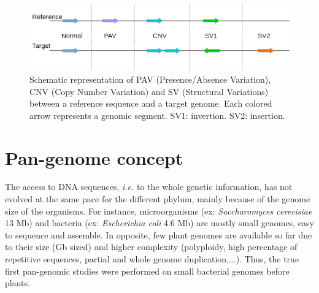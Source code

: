 \documentclass[a4paper,10pt,twoside]{report}
\begin{document}
\begin{figure}[ht]
\centering

 \includegraphics[scale=1]{PAVcnvSV.png}
% 
% 
 \caption{Schematic representation of PAV (Presence/Absence Variation), CNV (Copy Number Variation) and SV (Structural Variations) between a reference sequence and a target genome. Each colored arrow represents a genomic segment. SV1: invertion. SV2: insertion.}
 \label{PAVcaption}
\end{figure}

\section{Pan-genome concept}

The access to DNA sequences, \textit{i.e.} to the whole genetic information, has not evolved at the same pace for the different phylum, mainly because of the genome size of the organisms. For instance, microorganisms (ex: \emph{Saccharomyces cerevisiae} 13 Mb) and bacteria (ex: \emph{Escherichia coli} 4.6 Mb) are mostly small genomes, easy to sequence and assemble. In  opposite, few plant genomes are available so far due to their size (Gb sized) and higher complexity (polyploidy, high percentage of repetitive sequences, partial and whole genome duplication,...). Thus, the true first pan-genomic studies were performed on small bacterial genomes \cite{Tettelin2005,Tettelin2008} before plants. 
\end{document}
